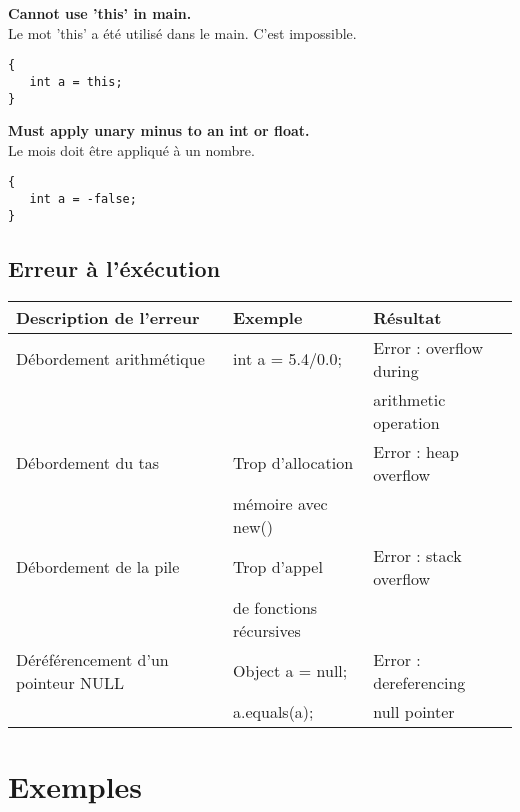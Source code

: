 \documentclass[a4,12pt]{article}
\begin{document}
\textbf{Cannot use 'this' in main.}\\
Le mot 'this' a été utilisé dans le main. C'est impossible.
\begin{lstlisting}
{
   int a = this;
}
\end{lstlisting}




\textbf{Must apply unary minus to an int or float.}\\
Le mois doit être appliqué à un nombre.
\begin{lstlisting}
{
   int a = -false;
}
\end{lstlisting}



\subsection{Erreur à l'éxécution}
\begin{tabular}{|l|l|l|}
\hline
   Description de l'erreur & Exemple & Résultat \\
   \hline
   Débordement arithmétique & int a = 5.4/0.0; & Error : overflow during \\
      &  &  arithmetic operation \\
   \hline
   Débordement du tas & Trop d'allocation & Error : heap overflow \\
    &  mémoire avec new() &  \\
   \hline
   Débordement de la pile & Trop d'appel& Error : stack overflow \\
         & de fonctions récursives &\\
   
   \hline
   Déréférencement d'un pointeur NULL & Object a = null;  & Error : dereferencing  \\
   & a.equals(a); & null pointer \\
   \hline
\end{tabular}

\section{Exemples}
\end{document}
